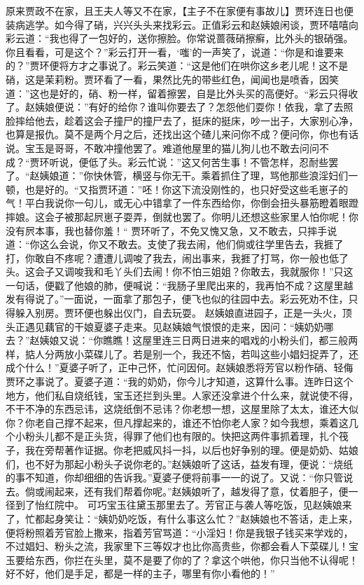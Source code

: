 \documentclass[12pt,oneside]{book}
\begin{document}
原来贾政不在家，且王夫人等又不在家，【主子不在家便有事故儿】贾环连日也便装病逃学。如今得了硝，兴兴头头来找彩云。正值彩云和赵姨娘闲谈，贾环嘻嘻向彩云道：“我也得了一包好的，送你擦脸。你常说蔷薇硝擦癣，比外头的银硝强。你且看看，可是这个？”彩云打开一看，‘嗤’的一声笑了，说道：“你是和谁要来的？”贾环便将方才之事说了。彩云笑道：“这是他们在哄你这乡老儿呢！这不是硝，这是茉莉粉。贾环看了一看，果然比先的带些红色，闻闻也是喷香，因笑道：”这也是好的，硝、粉一样，留着擦罢，自是比外头买的高便好。“彩云只得收了。赵姨娘便说：”有好的给你？谁叫你要去了？怎怨他们耍你！依我，拿了去照脸摔给他去，趁着这会子撞尸的撞尸去了，挺床的挺床，吵一出子，大家别心净，也算是报仇。莫不是两个月之后，还找出这个碴儿来问你不成？便问你，你也有话说。宝玉是哥哥，不敢冲撞他罢了。难道他屋里的猫儿狗儿也不敢去问问不成？“贾环听说，便低了头。彩云忙说：”这又何苦生事！不管怎样，忍耐些罢了。“赵姨娘道：”你快休管，横竖与你无干。乘着抓住了理，骂他那些浪淫妇们一顿，也是好的。“又指贾环道：”呸！你这下流没刚性的，也只好受这些毛崽子的气！平白我说你一句儿，或无心中错拿了一件东西给你，你倒会扭头暴筋瞪着眼蹬摔娘。这会子被那起屄崽子耍弄，倒就也罢了。你明儿还想这些家里人怕你呢！你没有屄本事，我也替你羞！“
贾环听了，不免又愧又急，又不敢去，只摔手说道：“你这么会说，你又不敢去。支使了我去闹，他们倘或往学里告去，我捱了打，你敢自不疼呢？遭遭儿调唆了我去，闹出事来，我捱了打骂，你一般也低了头。这会子又调唆我和毛丫头们去闹！你不怕三姐姐？你敢去，我就服你！”只这一句话，便戳了他娘的肺，便喊说：“我肠子里爬出来的，我再怕不成？这屋里越发有得说了。”一面说，一面拿了那包子，便飞也似的往园中去。彩云死劝不住，只得躲入别房。贾环便也躲出仪门，自去玩耍。
赵姨娘直进园子，正是一头火，顶头正遇见藕官的干娘夏婆子走来。见赵姨娘气恨恨的走来，因问：“姨奶奶哪去？”赵姨娘又说：“你瞧瞧！这屋里连三日两日进来的唱戏的小粉头们，都三般两样，掂人分两放小菜碟儿了。若是别一个，我还不恼，若叫这些小娼妇捉弄了，还成个什么！”夏婆子听了，正中己怀，忙问因何。赵姨娘悉将芳官以粉作硝、轻侮贾环之事说了。夏婆子道：“我的奶奶，你今儿才知道，这算什么事。连昨日这个地方，他们私自烧纸钱，宝玉还拦到头里。人家还没拿进个什么来，就说使不得，不干不净的东西忌讳，这烧纸倒不忌讳？你老想一想，这屋里除了太太，谁还大似你？你老自己撑不起来，但凡撑起来的，谁还不怕你老人家？如今我想，乘着这几个小粉头儿都不是正头货，得罪了他们也有限的。快把这两件事抓着理，扎个筏子，我在旁帮著作证据。你老把威风抖一抖，以后也好争别的理。便是奶奶、姑娘们，也不好为那起小粉头子说你老的。”赵姨娘听了这话，益发有理，便说：“烧纸的事不知道，你却细细的告诉我。”夏婆子便将前事一一的说了。又说：“你只管说去。倘或闹起来，还有我们帮着你呢。”赵姨娘听了，越发得了意，仗着胆子，便一径到了怡红院中。
可巧宝玉往黛玉那里去了。芳官正与袭人等吃饭，见赵姨娘来了，忙都起身笑让：“姨奶奶吃饭，有什么事这么忙？”赵姨娘也不答话，走上来，便将粉照着芳官脸上撒来，指着芳官骂道：“小淫妇！你是我银子钱买来学戏的，不过娼妇、粉头之流，我家里下三等奴才也比你高贵些，你都会看人下菜碟儿！宝玉要给东西，你拦在头里，莫不是要了你的了？拿这个哄他，你只当他不认得呢！好不好，他们是手足，都是一样的主子，哪里有你小看他的！”
\end{document}
